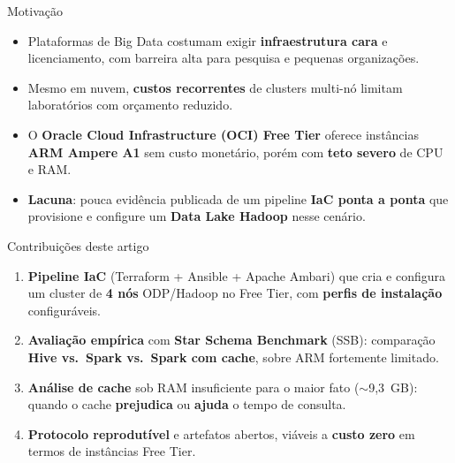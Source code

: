 
\begin{frame}{Motiva\c{c}\~ao}
  \begin{itemize}
    \item Plataformas de Big Data costumam exigir \textbf{infraestrutura cara} e licenciamento, com barreira alta para pesquisa e pequenas organiza\c{c}\~oes.
    \item Mesmo em nuvem, \textbf{custos recorrentes} de clusters multi-n\'o limitam laborat\'orios com or\c{c}amento reduzido.
    \item O \textbf{Oracle Cloud Infrastructure (OCI) Free Tier} oferece inst\^ancias \textbf{ARM Ampere A1} sem custo monet\'ario, por\'em com \textbf{teto severo} de CPU e RAM.
    \item \textbf{Lacuna}: pouca evid\^encia publicada de um pipeline \textbf{IaC ponta a ponta} que provisione e configure um \textbf{Data Lake Hadoop} nesse cen\'ario.
  \end{itemize}
\end{frame}

\begin{frame}{Contribui\c{c}\~oes deste artigo}
  \begin{enumerate}
    \item \textbf{Pipeline IaC} (Terraform + Ansible + Apache Ambari) que cria e configura um cluster de \textbf{4 n\'os} ODP/Hadoop no Free Tier, com \textbf{perfis de instala\c{c}\~ao} configur\'aveis.
    \item \textbf{Avalia\c{c}\~ao emp\'irica} com \textbf{Star Schema Benchmark} (SSB): compara\c{c}\~ao \textbf{Hive vs.\ Spark vs.\ Spark com cache}, sobre ARM fortemente limitado.
    \item \textbf{An\'alise de cache} sob RAM insuficiente para o maior fato ($\sim$9{,}3~GB): quando o cache \textbf{prejudica} ou \textbf{ajuda} o tempo de consulta.
    \item \textbf{Protocolo reprodut\'ivel} e artefatos abertos, vi\'aveis a \textbf{custo zero} em termos de inst\^ancias Free Tier.
  \end{enumerate}
\end{frame}
